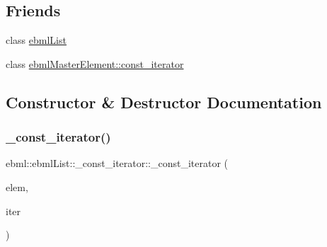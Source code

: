 \subsection*{Friends}
\begin{DoxyCompactItemize}
\item 
class \mbox{\hyperlink{classebml_1_1ebmlList_1_1__const__iterator_af371b14231393d2eef62cb562cdd6e2d}{ebml\+List}}
\item 
class \mbox{\hyperlink{classebml_1_1ebmlList_1_1__const__iterator_a734affd0f736e2e4e03ab2cf8a9f9b26}{ebml\+Master\+Element\+::const\+\_\+iterator}}
\end{DoxyCompactItemize}


\subsection{Constructor \& Destructor Documentation}
\mbox{\label{classebml_1_1ebmlList_1_1__const__iterator_aae58bee847fdcb8173e9b1eb220c7609}} 
\subsubsection{\texorpdfstring{\+\_\+const\+\_\+iterator()}{\_const\_iterator()}\hspace{0.1cm}{\footnotesize\ttfamily [1/2]}}
{\footnotesize\ttfamily ebml\+::ebml\+List\+::\+\_\+const\+\_\+iterator\+::\+\_\+const\+\_\+iterator (\begin{DoxyParamCaption}\item[{const \mbox{\hyperlink{namespaceebml_a2deef4e8071531b32e3533f1bf978917}{c\+\_\+ebml\+Element\+\_\+sp}} \&}]{elem,  }\item[{const std\+::vector$<$ \mbox{\hyperlink{namespaceebml_adad533b7705a16bb360fe56380c5e7be}{ebml\+Element\+\_\+sp}} $>$\+::const\+\_\+iterator \&}]{iter }\end{DoxyParamCaption})\hspace{0.3cm}{\ttfamily [protected]}}

\mbox{\label{classebml_1_1ebmlList_1_1__const__iterator_a2e4df37bf8485e7517498683f5ab5ca6}} 
